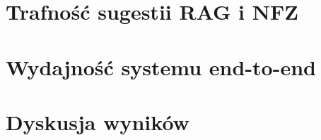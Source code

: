 \section{Trafność sugestii RAG i NFZ}\label{sec:ewaluacja-rag}

%

\section{Wydajność systemu end-to-end}\label{sec:ewaluacja-wydajnosc}

%
%
%
%

\section{Dyskusja wyników}\label{sec:dyskusja}

%
%
%
%
